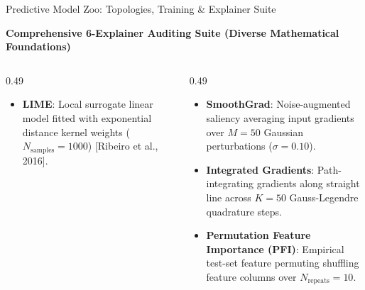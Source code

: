 \documentclass[aspectratio=169,10pt]{beamer}
\begin{document}
\begin{frame}{Predictive Model Zoo: Topologies, Training \& Explainer Suite}
\begin{block}{\textbf{Comprehensive 6-Explainer Auditing Suite (Diverse Mathematical Foundations)}}
\begin{columns}[t]
\begin{column}{0.49\textwidth}
\begin{itemize}
          \item \textbf{LIME}: Local surrogate linear model fitted with exponential distance kernel weights ($N_{\text{samples}} = 1000$) [Ribeiro et al., 2016].
        \end{itemize}
      \end{column}
      \begin{column}{0.49\textwidth}
        \begin{itemize}\setlength\itemsep{1pt}
          \item \textbf{SmoothGrad}: Noise-augmented saliency averaging input gradients over $M = 50$ Gaussian perturbations ($\sigma = 0.10$).
          \item \textbf{Integrated Gradients}: Path-integrating gradients along straight line across $K = 50$ Gauss-Legendre quadrature steps.
          \item \textbf{Permutation Feature Importance (PFI)}: Empirical test-set feature permuting shuffling feature columns over $N_{\text{repeats}} = 10$.
        \end{itemize}
      \end{column}
    \end{columns}
  \end{block}
\end{frame}
\end{document}
